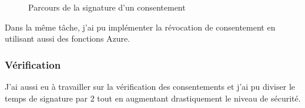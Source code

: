 \documentclass[12pt, a4paper]{report}
\begin{document}
\begin{figure}[H]
\begin{center}
    \end{center}
    \caption{Parcours de la signature d'un consentement}
\end{figure}
Dans la même tâche, j'ai pu implémenter la révocation de consentement en utilisant aussi des fonctions Azure.
\subsubsection{Vérification}
J'ai aussi eu à travailler sur la vérification des consentements et j'ai pu diviser le temps de signature par 2 tout en augmentant drastiquement le niveau de sécurité.
\end{document}
